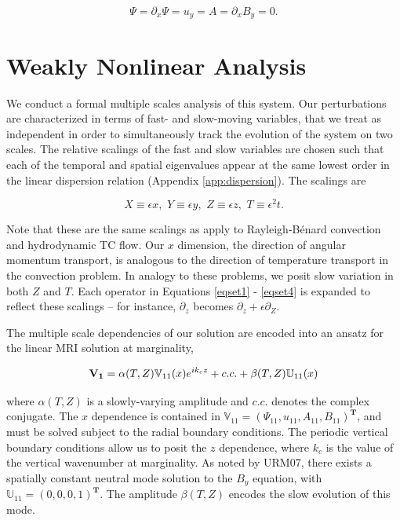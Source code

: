 \documentclass[twocolumn]{aastex61}
\newcommand{\beq}{\begin{equation}}
\newcommand{\eeq}{\end{equation}}
\begin{document}
\beq\label{eq:wallbcs}
\Psi = \partial_x \Psi = u_y = A = \partial_x B_y = 0.
\eeq


\section{Weakly Nonlinear Analysis}\label{sec:wnl}

We conduct a formal multiple scales analysis of this system. Our perturbations are characterized in terms of fast- and slow-moving variables, that we treat as independent in order to simultaneously track the evolution of the system on two scales. The relative scalings of the fast and slow variables are chosen such that each of the temporal and spatial eigenvalues appear at the same lowest order in the linear dispersion relation (Appendix \ref{app:dispersion}). The scalings are

\beq\label{scalings}
X \equiv \epsilon x,  \, \, Y \equiv \epsilon y, \, \, Z \equiv \epsilon z, \, \, T \equiv \epsilon^2 t.
\eeq

Note that these are the same scalings as apply to Rayleigh-B\'enard convection and hydrodynamic TC flow. Our $x$ dimension, the direction of angular momentum transport, is analogous to the direction of temperature transport in the convection problem. In analogy to these problems, we posit slow variation in both $Z$ and $T$. Each operator in Equations \ref{eqset1} - \ref{eqset4} is expanded to reflect these scalings -- for instance, $\partial_z$ becomes $\partial_z + \epsilon\partial_Z$. 

The multiple scale dependencies of our solution are encoded into an ansatz for the linear MRI solution at marginality,

\beq
\label{V1_ansatz}
\mathbf{V_1} = \alpha(T, Z) \mathbb{V}_{11}(x) e^{i k_c z} + c.c. + \beta(T, Z)\mathbb{U}_{11}(x)\\
\eeq

where $\alpha(T,Z)$ is a slowly-varying amplitude and $c.c.$ denotes the complex conjugate. The $x$ dependence is contained in $\mathbb{V}_{11} = (\Psi_{11}, u_{11}, A_{11}, B_{11})^\mathbf{T}$, and must be solved subject to the radial boundary conditions. The periodic vertical boundary conditions allow us to posit the $z$ dependence, where $k_c$ is the value of the vertical wavenumber at marginality. As noted by URM07, there exists a spatially constant neutral mode solution to the $B_y$ equation, with $\mathbb{U}_{11} = (0, 0, 0, 1)^\mathbf{T}$. The amplitude $\beta(T, Z)$ encodes the slow evolution of this mode.  %
\end{document}
